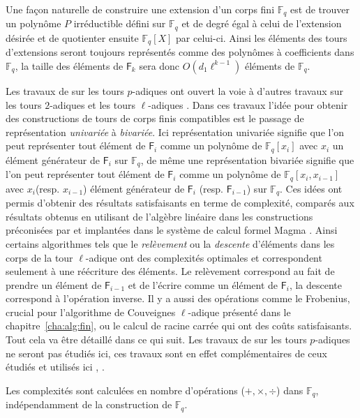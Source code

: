 \documentclass[10pt,a4paper]{book}
\theoremstyle{plain}
\theoremstyle{definition}
\theoremstyle{definition}
\theoremstyle{definition}
\theoremstyle{definition}
\theoremstyle{remark}
\theoremstyle{remark}
\theoremstyle{definition}
\begin{document}
Une façon naturelle de  construire une extension d'un corps fini $\mathbb{F}_q$ est de trouver un polynôme $P$ irréductible défini sur $\mathbb{F}_q$ et de degré égal à celui de l'extension désirée et de quotienter ensuite $\mathbb{F}_q[X]$ par celui-ci.
Ainsi les éléments des tours d'extensions seront toujours représentés comme des polynômes à coefficients dans $\mathbb{F}_q$, la taille des éléments de $\mathsf{F}_{k}$ sera donc $O(d_1\ell^{k-1})$ éléments de $\mathbb{F}_q$. 

Les travaux de \cite{DeFeo-Shost'12} sur les tours $p$-adiques ont ouvert la voie à d'autres travaux sur les tours $2$-adiques \cite{Doliskani-Schost15} et les tours $\ell$-adiques \cite{DeFeo-Doliskani-Schost13}. Dans ces travaux l'idée pour obtenir des constructions de tours de corps finis compatibles est le passage de représentation \textit{univariée} à \textit{bivariée}. Ici représentation univariée signifie que l'on peut représenter tout élément de $\mathsf{F}_i$ comme un polynôme de $\mathbb{F}_q[x_i]$ avec $x_i$ un élément générateur de $\mathsf{F}_i$ sur $\mathbb{F}_q$, de même une représentation bivariée signifie que l'on peut représenter tout élément de $\mathsf{F}_i$ comme un polynôme de $\mathbb{F}_q[x_i, x_{i-1}]$ avec $x_i$(resp. $x_{i-1}$) élément générateur de $\mathsf{F}_i$ (resp. $\mathsf{F}_{i-1}$) sur $\mathbb{F}_q$. Ces idées ont permis d'obtenir des résultats satisfaisants en terme de complexité, comparés aux résultats obtenus en utilisant de l'algèbre linéaire dans les constructions préconisées par \cite{BosmaCS97} et implantées dans le système de calcul formel Magma \cite{magma97}. Ainsi certains algorithmes tels que le \textit{relèvement} ou la \textit{descente} d'éléments dans les corps de la tour $\ell$-adique ont des complexités optimales et correspondent seulement à une réécriture des éléments. Le relèvement correspond au fait de prendre un élément de $\mathsf{F}_{i-1}$ et de l'écrire comme un élément de $\mathsf{F}_i$, la descente correspond à l'opération inverse. Il y a aussi des opérations comme le Frobenius, crucial pour l'algorithme de Couveignes $\ell$-adique présenté dans le chapitre~\ref{cha:alg:fin}, ou le calcul de racine carrée qui ont des coûts satisfaisants. Tout cela va être détaillé dans ce qui suit. Les travaux de  \cite{DeFeo-Shost'12} sur les tours $p$-adiques ne seront pas étudiés ici, ces travaux sont en effet complémentaires de ceux étudiés et utilisés ici \cite{Doliskani-Schost15}, \cite{DeFeo-Doliskani-Schost13}.

Les complexités sont calculées en nombre d'opérations ($+, \times,\div$) dans $\mathbb{F}_q$, indépendamment de la construction de $\mathbb{F}_q$. 
\end{document}
